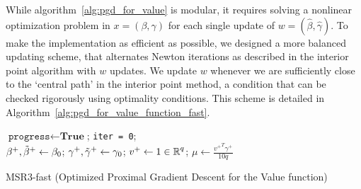 While algorithm~\eqref{alg:pgd_for_value} is modular, it requires solving a nonlinear optimization problem in $x = (\beta, \gamma)$ for each single update
of $w = (\hat \beta, \hat \gamma)$. To make the implementation as efficient as possible, we designed a more balanced updating scheme, that 
alternates Newton iterations as described in the interior point algorithm with $w$ updates. We update $w$ whenever we are sufficiently close 
to the `central path' in the interior point method, a condition that can be checked rigorously using optimality conditions. 
This scheme is detailed in Algorithm~\ref{alg:pgd_for_value_function_fast}.


\begin{algorithm}[H]
\SetAlgoLined
$\texttt{progress}\leftarrow \textbf{True}$; \quad \texttt{iter = 0}; \\
$\beta^+, \tilde\beta^+\leftarrow\beta_0$; 
\quad $\gamma^+, \tilde\gamma^+\leftarrow\gamma_0$;  
\quad $v^+ \leftarrow 1 \in \operatorname{\mathbb{R}}^q$; 
\quad  $\mu \leftarrow \frac{{v^+}^T\gamma^+}{10 q}$\\
 \Return{$\tbeta^+$, $\tgamma^+$}
 \caption{\label{alg:pgd_for_value_function_fast}MSR3-fast (Optimized Proximal Gradient Descent for the Value function)}
\end{algorithm}


